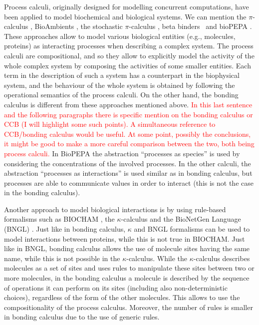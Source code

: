 \documentclass[runningheads]{llncs}
\newcommand\anna[1]{\textcolor{red}{#1}}
\begin{document}
Process calculi, originally designed for modelling concurrent computations, have been applied to model biochemical and biological systems. We can mention the $\pi$-calculus \cite{MilnerPi,Regev2004}, BioAmbients \cite{RegevBioambients}, the stochastic $\pi$-calculus \cite{PriamiStochasticPi}, beta binders~\cite{betabinders} and bioPEPA \cite{CiocchettaBiopepa}. These approaches allow to model various biological entities (e.g., molecules, proteins) as interacting processes when describing a complex system. The process calculi are compositional, and so they allow to explicitly model the activity of the whole complex system by composing the activities of some smaller entities. Each term in the description of such a system has a
counterpart in the biophysical system, and the behaviour of the whole system is obtained by following the operational semantics of the process calculi. On the other hand, the bonding calculus \cite{NaCo18} is different from these approaches mentioned above.  \anna{In this last sentence and the following paragraphs there is specific mention on the bonding calculus or CCB (I will highlight some such points). A simultaneous reference to CCB/bonding calculus would be useful. At some point, possibly the conclusions, it might be good to make a more careful comparison between the two, both being process calculi.} In BioPEPA the abstraction ``processes as species'' is used by considering the concentrations of the involved processes. In the other calculi,  the abstraction ``processes as interactions'' is used similar as in bonding calculus, but processes are able to communicate values in order to interact (this is not the case in the bonding calculus). 

Another approach to model biological interactions is by using rule-based formalisms such as BIOCHAM \cite{biocham}, the $\kappa$-calculus  \cite{danoscausality} and the BioNetGen Language (BNGL) \cite{pmid19399430}. Just like in bonding calculus, $\kappa$ and BNGL formalisms can be used to model interactions between proteins, while this is not true in BIOCHAM. Just like in BNGL, bonding calculus allows the use of molecule sites having the same name, while this is not possible in the $\kappa$-calculus. While the $\kappa$-calculus describes molecules as a set of sites and uses rules to manipulate these sites between two or more molecules, in the  bonding calculus \cite{NaCo18} a molecule is described by the sequence of operations it can perform on its sites (including also non-deterministic choices), regardless of the form of the other molecules. This allows to use the compositionality of the process calculus. Moreover, the number of rules is smaller in bonding calculus due to the use of generic rules.
\end{document}
